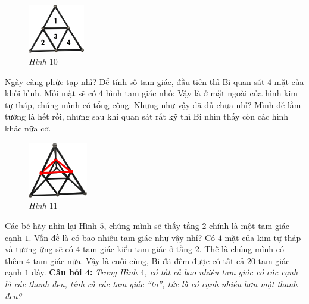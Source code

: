 	\vskip 0.1cm
	\begin{figure}
		\centering
		\vspace*{-10pt}
		\captionsetup{labelformat= empty, justification=centering} \includegraphics[width=0.22\textwidth]{10}
		\caption{\small\textit{Hình $10$}}
		\vspace*{-15pt}
	\end{figure}
	Ngày càng phức tạp nhỉ? Để tính số tam giác, đầu tiên thì Bi quan sát $4$ mặt của khối hình. Mỗi mặt sẽ có $4$ hình tam giác nhỏ:
	\vskip 0.1cm
	Vậy là ở mặt ngoài của hình kim tự tháp, chúng mình có tổng cộng:
	\vskip 0.1cm
	\vskip 0.1cm
	\vspace*{5pt}
	Nhưng như vậy đã đủ chưa nhỉ? Mình dễ lầm tưởng là hết rồi, nhưng sau khi quan sát rất kỹ thì Bi nhìn thấy còn các hình khác nữa cơ.
	\vskip 0.1cm
	\begin{figure}
		\centering
		\vspace*{-15pt}
		\captionsetup{labelformat= empty, justification=centering} \includegraphics[width=0.23\textwidth]{11}
		\vspace*{-5pt}
		\caption{\small\textit{Hình $11$}}
		\vspace*{-20pt}
	\end{figure}
	\vspace*{-1pt}
	Các bé hãy nhìn lại Hình $5$, chúng mình sẽ thấy tầng $2$ chính là một tam giác cạnh $1$. Vấn đề là có bao nhiêu tam giác như vậy nhỉ? Có $4$ mặt của kim tự tháp và tương ứng sẽ có $4$ tam giác kiểu tam giác ở tầng $2$. Thế là chúng mình có thêm $4$ tam giác nữa.
	\vskip 0.15cm
	Vậy là cuối cùng, Bi đã đếm được có tất cả $20$ tam giác cạnh $1$ đấy.
	\vskip 0.1cm
	\textbf{Câu hỏi $\pmb{4}$:} \textit{Trong Hình $4$, có tất cả bao nhiêu tam giác có các cạnh là các thanh đen, tính cả các tam giác “to”, tức là có cạnh nhiều hơn một thanh đen?}
